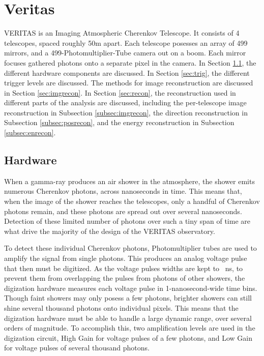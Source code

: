 \cleartooddpage[\thispagestyle{empty}]
\chapter{Veritas}

VERITAS is an Imaging Atmospheric Cherenkov Telescope.
It consists of 4 telescopes, spaced roughly 50m apart.
Each telescope posesses an array of 499 mirrors, and a 499-Photomultiplier-Tube camera out on a boom.
Each mirror focuses gathered photons onto a separate pixel in the camera.
In Section \ref{sec:hardware}, the different hardware components are discussed.
In Section \ref{sec:trig}, the different trigger levels are discussed.
The methods for image reconstruction are discussed in Section \ref{sec:imgrecon}.
In Section \ref{sec:recon}, the reconstruction used in different parts of the analysis are discussed, including the per-telescope image reconstruction in Subsection \ref{subsec:imgrecon}, the direction reconstruction in Subsection \ref{subsec:posrecon}, and the energy reconstruction in Subsection \ref{subsec:enrecon}.


\section{Hardware}\label{sec:hardware}
When a gamma-ray produces an air shower in the atmosphere, the shower emits numerous Cherenkov photons, across nanoseconds in time.
This means that, when the image of the shower reaches the telescopes, only a handful of Cherenkov photons remain, and these photons are spread out over several nanoseconds.
Detection of these limited number of photons over such a tiny span of time are what drive the majority of the design of the VERITAS observatory.

To detect these individual Cherenkov photons, Photomultiplier tubes are used to amplify the signal from single photons.
This produces an analog voltage pulse that then must be digitized.
As the voltage pulses widths are kept to ~ns, to prevent them from overlapping the pulses from photons of other showers, the digization hardware measures each voltage pulse in 1-nanosecond-wide time bins.
Though faint showers may only posess a few photons, brighter showers can still shine several thousand photons onto individual pixels.
This means that the digization hardware must be able to handle a large dynamic range, over several orders of magnitude.
To accomplish this, two amplification levels are used in the digization circuit, High Gain for voltage pulses of a few photons, and Low Gain for voltage pulses of several thousand photons.

